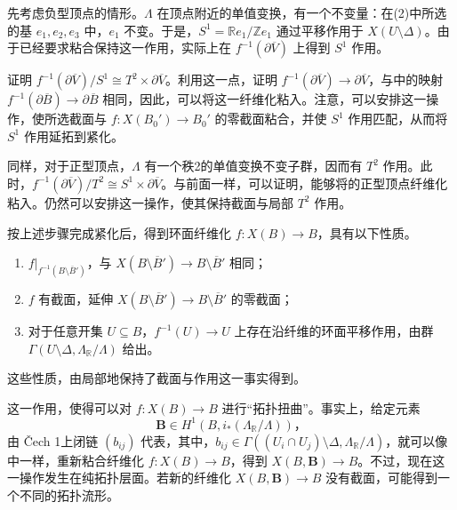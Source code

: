 先考虑负型顶点的情形。$\Lambda$ 在顶点附近的单值变换，有一个不变量：在(2)中所选的基 $e_1,e_2,e_3$ 中，$e_1$ 不变。于是，$S^1=\mathbb Re_1/\mathbb Ze_1$ 通过平移作用于 $X(U\setminus\Delta)$。由于已经要求粘合保持这一作用，实际上在 $f^{-1}(\partial\overline V)$ 上得到 $S^1$ 作用。

\begin{exercise}\label{exer:6.98}
证明 $f^{-1}(\partial\overline V)/S^1\cong T^2\times\partial\overline V$。利用这一点，证明 $f^{-1}(\partial\overline V)\to\partial\overline V$，与中的映射 $f^{-1}(\partial\overline B)\to\partial\overline B$ 相同，因此，可以将这一纤维化粘入。注意，可以安排这一操作，使所选截面与 $f\colon X(B_0')\to B_0'$ 的零截面粘合，并使 $S^1$ 作用匹配，从而将 $S^1$ 作用延拓到紧化。
\end{exercise}

同样，对于正型顶点，$\Lambda$ 有一个秩2的单值变换不变子群，因而有 $T^2$ 作用。此时，$f^{-1}(\partial\overline V)/T^2\cong S^1\times\partial\overline V$。与前面一样，可以证明，能够将的正型顶点纤维化粘入。仍然可以安排这一操作，使其保持截面与局部 $T^2$ 作用。

按上述步骤完成紧化后，得到环面纤维化 $f\colon X(B)\to B$，具有以下性质。
\begin{property*}\label{pty:6.compactification}
\begin{enumerate}[label=(\arabic*)]
\item $f|_{f^{-1}(B\setminus\overline B')}$，与 $X(B\setminus\overline B')\to B\setminus\overline B'$ 相同；
\item $f$ 有截面，延伸 $X(B\setminus\overline B')\to B\setminus\overline B'$ 的零截面；
\item 对于任意开集 $U\subseteq B$，$f^{-1}(U)\to U$ 上存在沿纤维的环面平移作用，由群 $\Gamma(U\setminus\Delta,\Lambda_{\mathbb R}/\Lambda)$ 给出。
\end{enumerate}
\end{property*}
这些性质，由局部地保持了截面与作用这一事实得到。

\begin{note}[numbered]\label{note:6.99}
这一作用，使得可以对 $f\colon X(B)\to B$ 进行“拓扑扭曲”。事实上，给定元素
\[
\mathbf B\in H^1(B,i_*(\Lambda_{\mathbb R}/\Lambda))\text{，}
\]
由 Čech 1上闭链 $(b_{ij})$ 代表，其中，$b_{ij}\in\Gamma((U_i\cap U_j)\setminus\Delta,\Lambda_{\mathbb R}/\Lambda)$，就可以像中一样，重新粘合纤维化 $f\colon X(B)\to B$，得到 $X(B,\mathbf B)\to B$。不过，现在这一操作发生在纯拓扑层面。若新的纤维化 $X(B,\mathbf B)\to B$ 没有截面，可能得到一个不同的拓扑流形。
\end{note}

